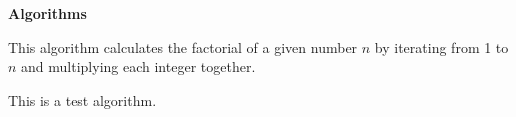 \clearpage
 \begingroup
	\begin{center}
		\textbf{{\Large\Large Algorithms}}
	\end{center}




This algorithm calculates the factorial of a given number \( n \) by iterating from 1 to \( n \) and multiplying each integer together.


This is a test algorithm.

\lipsum[3-5]

\endinput
\endgroup
